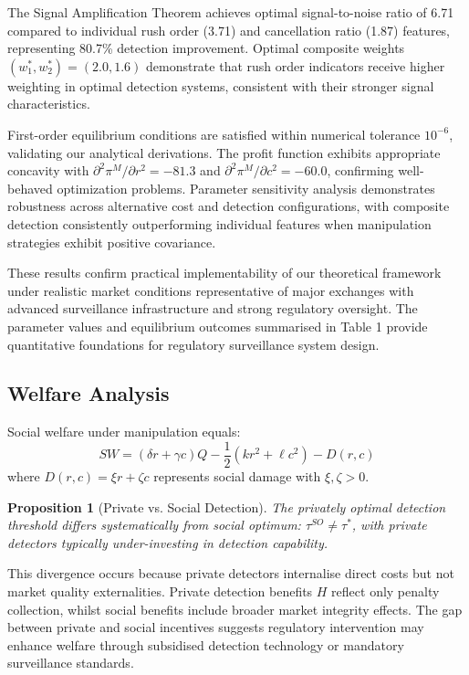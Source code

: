 \documentclass[12pt]{article}
\newtheorem{proposition}[theorem]{Proposition}
\begin{document}
The Signal Amplification Theorem achieves optimal signal-to-noise ratio of 6.71 compared to individual rush order (3.71) and cancellation ratio (1.87) features, representing 80.7\% detection improvement. Optimal composite weights $(w_1^*, w_2^*) = (2.0, 1.6)$ demonstrate that rush order indicators receive higher weighting in optimal detection systems, consistent with their stronger signal characteristics.

First-order equilibrium conditions are satisfied within numerical tolerance $10^{-6}$, validating our analytical derivations. The profit function exhibits appropriate concavity with $\partial^2\pi^M/\partial r^2 = -81.3$ and $\partial^2\pi^M/\partial c^2 = -60.0$, confirming well-behaved optimization problems. Parameter sensitivity analysis demonstrates robustness across alternative cost and detection configurations, with composite detection consistently outperforming individual features when manipulation strategies exhibit positive covariance.

These results confirm practical implementability of our theoretical framework under realistic market conditions representative of major exchanges with advanced surveillance infrastructure and strong regulatory oversight. The parameter values and equilibrium outcomes summarised in Table 1 provide quantitative foundations for regulatory surveillance system design.

\subsection{Welfare Analysis}

Social welfare under manipulation equals:
\begin{equation}
SW = (\delta r + \gamma c)Q - \frac{1}{2}(kr^2 + \ell c^2) - D(r,c)
\end{equation}
where $D(r,c) = \xi r + \zeta c$ represents social damage with $\xi, \zeta > 0$.

\begin{proposition}[Private vs. Social Detection]
The privately optimal detection threshold differs systematically from social optimum: $\tau^{SO} \neq \tau^*$, with private detectors typically under-investing in detection capability.
\end{proposition}

This divergence occurs because private detectors internalise direct costs but not market quality externalities. Private detection benefits $H$ reflect only penalty collection, whilst social benefits include broader market integrity effects. The gap between private and social incentives suggests regulatory intervention may enhance welfare through subsidised detection technology or mandatory surveillance standards.
\end{document}
